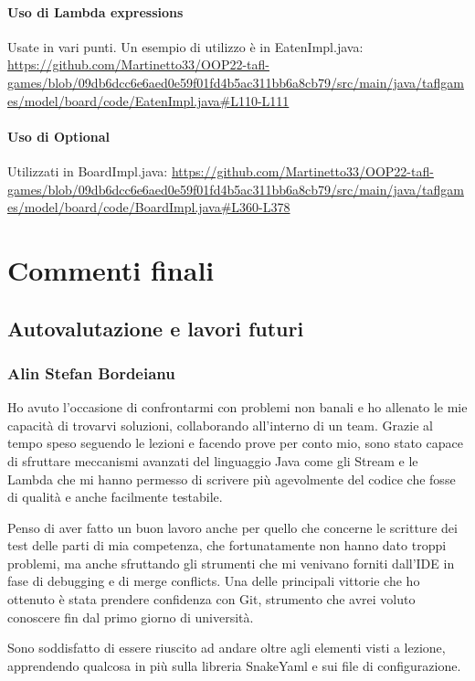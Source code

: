 \documentclass[a4paper,12pt]{report}
\begin{document}
\subsubsection{Uso di Lambda expressions}
Usate in vari punti. Un esempio di utilizzo è in EatenImpl.java: \url{https://github.com/Martinetto33/OOP22-tafl-games/blob/09db6dcc6e6aed0e59f01fd4b5ac311bb6a8cb79/src/main/java/taflgames/model/board/code/EatenImpl.java#L110-L111}

\subsubsection{Uso di Optional}
Utilizzati in BoardImpl.java: \url{https://github.com/Martinetto33/OOP22-tafl-games/blob/09db6dcc6e6aed0e59f01fd4b5ac311bb6a8cb79/src/main/java/taflgames/model/board/code/BoardImpl.java#L360-L378}


\chapter{Commenti finali}


\section{Autovalutazione e lavori futuri}

\subsection{Alin Stefan Bordeianu}
Ho avuto l'occasione di confrontarmi con problemi non banali e ho allenato le mie capacità di trovarvi soluzioni, collaborando all'interno di un team. Grazie al tempo speso seguendo le lezioni e facendo prove per conto mio, sono stato capace di sfruttare meccanismi avanzati del linguaggio Java come gli Stream e le Lambda che mi hanno permesso di scrivere più agevolmente del codice che fosse di qualità e anche facilmente testabile.

Penso di aver fatto un buon lavoro anche per quello che concerne le scritture dei test delle parti di mia competenza, che fortunatamente non hanno dato troppi problemi, ma anche sfruttando gli strumenti che mi venivano forniti dall'IDE in fase di debugging e di merge conflicts. Una delle principali vittorie che ho ottenuto è stata prendere confidenza con Git, strumento che avrei voluto conoscere fin dal primo giorno di università. 

Sono soddisfatto di essere riuscito ad andare oltre agli elementi visti a lezione, apprendendo qualcosa in più sulla libreria SnakeYaml e sui file di configurazione. 
\end{document}
